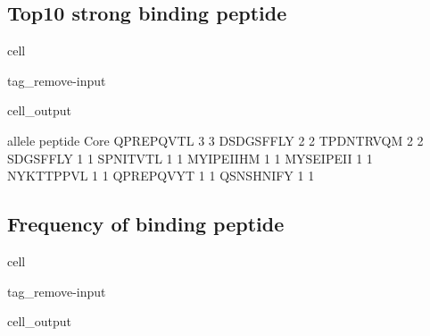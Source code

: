 \documentclass[letterpaper,10pt,english]{jupyterBook}
\begin{document}
\subsection{Top10 strong binding peptide}
\label{\detokenize{ipynb/chapter2:top10-strong-binding-peptide}}
\begin{sphinxuseclass}{cell}
\begin{sphinxuseclass}{tag_remove-input}\begin{sphinxVerbatimOutput}

\begin{sphinxuseclass}{cell_output}
\begin{sphinxVerbatim}[commandchars=\\\{\}]
           allele  peptide
Core                      
QPREPQVTL       3        3
DSDGSFFLY       2        2
TPDNTRVQM       2        2
\PYGZhy{}SDGSFFLY       1        1
SPN\PYGZhy{}ITVTL       1        1
MYIPEIIHM       1        1
MYSEIPEII       1        1
NYKTTPPVL       1        1
QPREPQVYT       1        1
QSNSHNIFY       1        1
\end{sphinxVerbatim}

\end{sphinxuseclass}\end{sphinxVerbatimOutput}

\end{sphinxuseclass}
\end{sphinxuseclass}

\subsection{Frequency of binding peptide}
\label{\detokenize{ipynb/chapter2:frequency-of-binding-peptide}}
\begin{sphinxuseclass}{cell}
\begin{sphinxuseclass}{tag_remove-input}\begin{sphinxVerbatimOutput}

\begin{sphinxuseclass}{cell_output}
\noindent{}

\end{sphinxuseclass}\end{sphinxVerbatimOutput}

\end{sphinxuseclass}
\end{sphinxuseclass}
\end{document}
